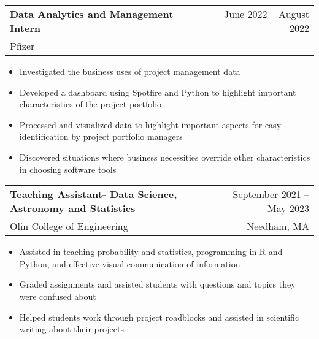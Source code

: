 \documentclass[letterpaper,10pt]{article}
\makeatletter
\newcommand{\resumeItem}[1]{
  \item\small{
    {#1\vspace{-2pt}}
  }
}
\newcommand{\resumeSubheading}[4]{
  \vspace{-2pt}\item
    \begin{tabular*}{0.97\textwidth}[t]{l@{\extracolsep{\fill}}r}
      \textbf{#1} & #2 \\
      \small#3 & \small #4 \\
    \end{tabular*}\vspace{-7pt}
}
\newcommand{\resumeSubSubheading}[2]{
    \item
    \begin{tabular*}{0.97\textwidth}{l@{\extracolsep{\fill}}r}
      \textit{\small#1} & \textit{\small #2} \\
    \end{tabular*}\vspace{-7pt}
}
\newcommand{\resumeSubHeadingListEnd}{\end{itemize}}
\newcommand{\resumeItemListStart}{\begin{itemize}}
\newcommand{\resumeItemListEnd}{\end{itemize}\vspace{-5pt}}
\makeatother
\begin{document}
  
    \resumeSubheading
      {Data Analytics and Management Intern}{June 2022 -- August 2022}
      {Pfizer}{}
      \resumeItemListStart
        \resumeItem{Investigated the business uses of project management data}
        \resumeItem{Developed a dashboard using Spotfire and Python to highlight important characteristics of the project portfolio}
        \resumeItem{Processed and visualized data to highlight important aspects for easy identification by project portfolio managers}
        \resumeItem{Discovered situations where business necessities override other characteristics in choosing software tools}
      \resumeItemListEnd
      



    \resumeSubheading
      {Teaching Assistant- Data Science, Astronomy and Statistics}{September 2021 -- May 2023}
      {Olin College of Engineering}{Needham, MA}
      \resumeItemListStart
        \resumeItem{Assisted in teaching probability and statistics, programming in R and Python, and effective visual communication of information}
        \resumeItem{Graded assignments and assisted students with questions and topics they were confused about}
        \resumeItem{Helped students work through project roadblocks and assisted in scientific writing about their projects}
    \resumeItemListEnd
\end{document}
